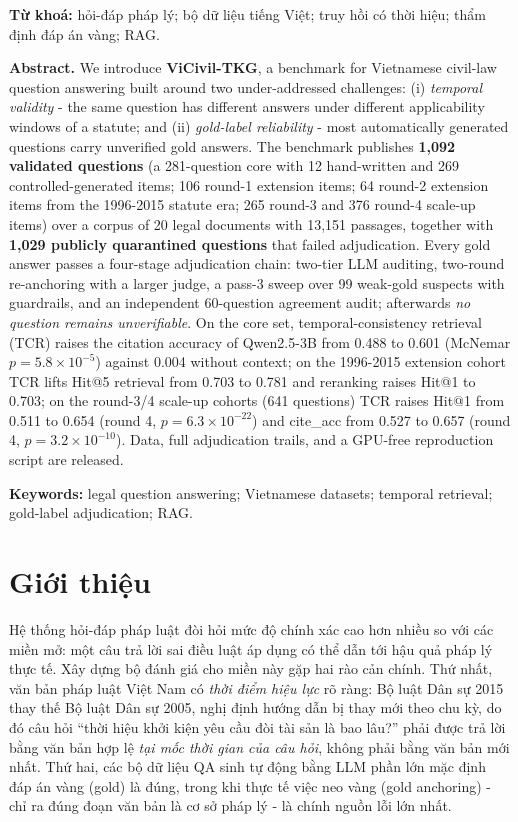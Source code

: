 \documentclass[11pt,a4paper]{article}
\begin{document}
\smallskip
\noindent\textbf{Từ khoá:} hỏi-đáp pháp lý; bộ dữ liệu tiếng Việt; truy hồi có thời hiệu; thẩm định đáp án vàng; RAG.

\smallskip
\noindent\textbf{Abstract.} We introduce \textbf{ViCivil-TKG}, a benchmark for Vietnamese civil-law question answering built around two under-addressed challenges: (i) \emph{temporal validity} - the same question has different answers under different applicability windows of a statute; and (ii) \emph{gold-label reliability} - most automatically generated questions carry unverified gold answers. The benchmark publishes \textbf{1,092 validated questions} (a 281-question core with 12 hand-written and 269 controlled-generated items; 106 round-1 extension items; 64 round-2 extension items from the 1996-2015 statute era; 265 round-3 and 376 round-4 scale-up items) over a corpus of 20 legal documents with 13{,}151 passages, together with \textbf{1,029 publicly quarantined questions} that failed adjudication. Every gold answer passes a four-stage adjudication chain: two-tier LLM auditing, two-round re-anchoring with a larger judge, a pass-3 sweep over 99 weak-gold suspects with guardrails, and an independent 60-question agreement audit; afterwards \emph{no question remains unverifiable}. On the core set, temporal-consistency retrieval (TCR) raises the citation accuracy of Qwen2.5-3B from 0.488 to 0.601 (McNemar $p=5.8\times10^{-5}$) against 0.004 without context; on the 1996-2015 extension cohort TCR lifts Hit@5 retrieval from 0.703 to 0.781 and reranking raises Hit@1 to 0.703; on the round-3/4 scale-up cohorts (641 questions) TCR raises Hit@1 from 0.511 to 0.654 (round 4, $p=6.3\times10^{-22}$) and cite\_acc from 0.527 to 0.657 (round 4, $p=3.2\times10^{-10}$). Data, full adjudication trails, and a GPU-free reproduction script are released.

\smallskip
\noindent\textbf{Keywords:} legal question answering; Vietnamese datasets; temporal retrieval; gold-label adjudication; RAG.

\section{Giới thiệu}

Hệ thống hỏi-đáp pháp luật đòi hỏi mức độ chính xác cao hơn nhiều so với các miền mở: một câu trả lời sai điều luật áp dụng có thể dẫn tới hậu quả pháp lý thực tế. Xây dựng bộ đánh giá cho miền này gặp hai rào cản chính. Thứ nhất, văn bản pháp luật Việt Nam có \emph{thời điểm hiệu lực} rõ ràng: Bộ luật Dân sự 2015 thay thế Bộ luật Dân sự 2005, nghị định hướng dẫn bị thay mới theo chu kỳ, do đó câu hỏi ``thời hiệu khởi kiện yêu cầu đòi tài sản là bao lâu?'' phải được trả lời bằng văn bản hợp lệ \emph{tại mốc thời gian của câu hỏi}, không phải bằng văn bản mới nhất. Thứ hai, các bộ dữ liệu QA sinh tự động bằng LLM phần lớn mặc định đáp án vàng (gold) là đúng, trong khi thực tế việc neo vàng (gold anchoring) - chỉ ra đúng đoạn văn bản là cơ sở pháp lý - là chính nguồn lỗi lớn nhất.
\end{document}
